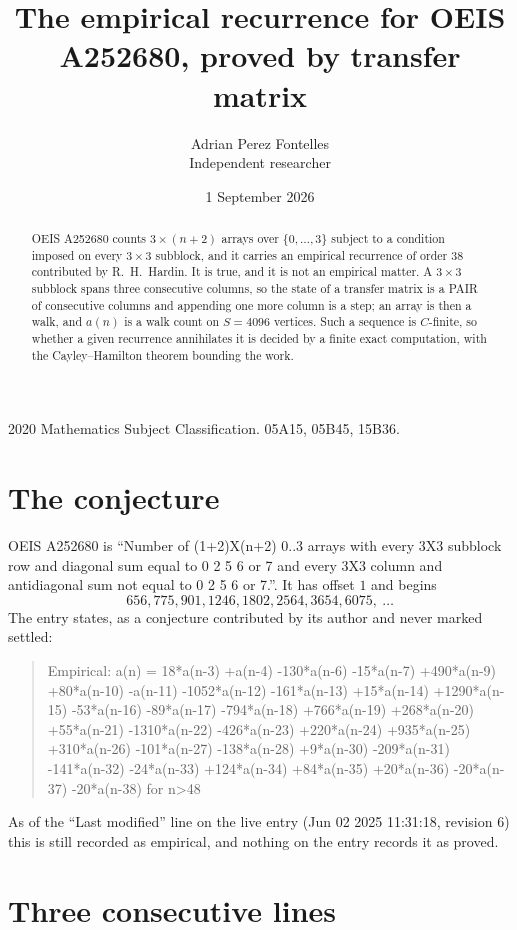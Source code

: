 \documentclass[11pt,a4paper]{article}
\title{The empirical recurrence for OEIS A252680, proved by transfer matrix}
\author{Adrian Perez Fontelles\\ \small Independent researcher}
\date{1 September 2026}
\theoremstyle{plain}
\theoremstyle{definition}
\begin{document}
\maketitle

\begin{abstract}
OEIS A252680 counts $3\times(n+2)$ arrays over $\{0,\dots,3\}$ subject to a condition imposed on
every $3\times3$ subblock, and it carries an empirical recurrence of order $38$
contributed by R.~H.~Hardin. It is true, and it is not an empirical matter. A $3\times3$
subblock spans three consecutive columns, so the state of a transfer matrix is a PAIR of
consecutive columns and appending one more column is a step; an array is then a walk, and
$a(n)$ is a walk count on $S=4096$ vertices. Such a sequence is $C$-finite, so whether a given
recurrence annihilates it is decided by a finite exact computation, with the Cayley--Hamilton
theorem bounding the work.
\end{abstract}

\noindent\small 2020 Mathematics Subject Classification. 05A15, 05B45, 15B36.\normalsize

\section{The conjecture}

OEIS A252680 is ``Number of (1+2)X(n+2) 0..3 arrays with every 3X3 subblock row and diagonal sum equal to 0 2 5 6 or 7 and every 3X3 column and antidiagonal sum not equal to 0 2 5 6 or 7.''. It has offset $1$ and begins
\[
656, 775, 901, 1246, 1802, 2564, 3654, 6075,\ \dots
\]
The entry states, as a conjecture contributed by its author and never marked settled:
\begin{quote}
Empirical: a(n) = 18*a(n-3) +a(n-4) -130*a(n-6) -15*a(n-7) +490*a(n-9) +80*a(n-10) -a(n-11) -1052*a(n-12) -161*a(n-13) +15*a(n-14) +1290*a(n-15) -53*a(n-16) -89*a(n-17) -794*a(n-18) +766*a(n-19) +268*a(n-20) +55*a(n-21) -1310*a(n-22) -426*a(n-23) +220*a(n-24) +935*a(n-25) +310*a(n-26) -101*a(n-27) -138*a(n-28) +9*a(n-30) -209*a(n-31) -141*a(n-32) -24*a(n-33) +124*a(n-34) +84*a(n-35) +20*a(n-36) -20*a(n-37) -20*a(n-38) for n>48
\end{quote}
As of the ``Last modified'' line on the live entry (Jun 02 2025 11:31:18, revision 6) this is still
recorded as empirical, and nothing on the entry records it as proved.

\section{Three consecutive lines}
\end{document}
